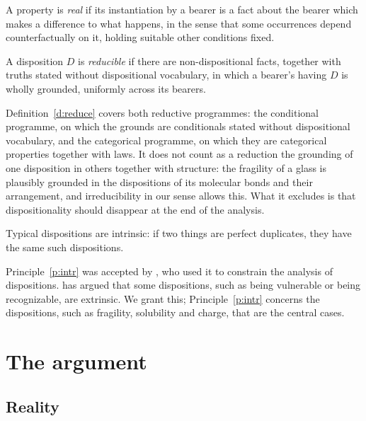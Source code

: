 \documentclass{situationist-preprint}
\begin{document}
\begin{definition}[Reality]\label{d:real}
A property is \emph{real} if its instantiation by a bearer is a fact about the bearer which makes a difference to what happens, in the sense that some occurrences depend counterfactually on it, holding suitable other conditions fixed.
\end{definition}

\begin{definition}[Reduction]\label{d:reduce}
A disposition $D$ is \emph{reducible} if there are non-dispositional facts, together with truths stated without dispositional vocabulary, in which a bearer's having $D$ is wholly grounded, uniformly across its bearers.
\end{definition}

Definition~\ref{d:reduce} covers both reductive programmes: the conditional programme, on which the grounds are conditionals stated without dispositional vocabulary, and the categorical programme, on which they are categorical properties together with laws. It does not count as a reduction the grounding of one disposition in others together with structure: the fragility of a glass is plausibly grounded in the dispositions of its molecular bonds and their arrangement, and irreducibility in our sense allows this. What it excludes is that dispositionality should disappear at the end of the analysis.

\begin{principle}[Intrinsicness]\label{p:intr}
Typical dispositions are intrinsic: if two things are perfect duplicates, they have the same such dispositions.
\end{principle}

Principle~\ref{p:intr} was accepted by \citet{Lewis1997}, who used it to constrain the analysis of dispositions. \citet{McKitrick2003} has argued that some dispositions, such as being vulnerable or being recognizable, are extrinsic. We grant this; Principle~\ref{p:intr} concerns the dispositions, such as fragility, solubility and charge, that are the central cases.

\section{The argument}\label{s:argument}

\subsection{Reality}
\end{document}

